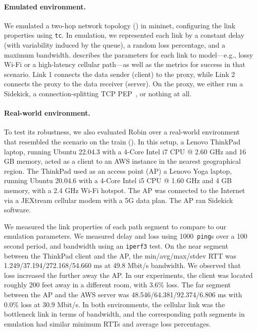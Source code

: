 \paragraph{Emulated environment.}
We emulated a two-hop network topology () in mininet,
configuring the link properties using \texttt{tc}.
In emulation, we represented
each link by a constant delay (with variability induced by the queue), a random
loss percentage, and a maximum bandwidth.
 describes the parameters
for each link to model---e.g., lossy Wi-Fi or a high-latency cellular
path---as well as the metrics for success in that scenario.
Link 1 connects the data sender (client) to the proxy,
while Link 2 connects the proxy to the data receiver (server).
On the proxy, we either run a Sidekick,
a connection-splitting TCP PEP~\cite{caini2006pepsal}, or nothing at all.

\paragraph{Real-world environment.}
To test its robustness, we also evaluated Robin over a real-world
environment that resembled the scenario on the train ().
In this setup, a Lenovo ThinkPad laptop, running Ubuntu 22.04.3 with a 4-Core
Intel i7 CPU @ 2.60 GHz and 16 GB memory, acted as a client to an AWS instance in
the nearest geographical region. The ThinkPad used as an access point (AP)
a Lenovo Yoga laptop, running Ubuntu 20.04.6 with a 4-Core Intel i5 CPU @
1.60 GHz and 4 GB memory, with a 2.4 GHz Wi-Fi hotspot.
The AP was connected to the Internet via a JEXtream cellular modem
with a 5G data plan. The AP ran Sidekick software.

We measured the link properties of each path segment to compare to
our emulation parameters. We measured delay and loss using 1000~\texttt{ping}s
over a 100 second period, and bandwidth using an \texttt{iperf3} test.
On the near segment between the ThinkPad client and the AP,
the min/avg/max/stdev RTT was 1.249/37.194/272.168/54.660 ms
at 49.8 Mbit/s bandwidth. We observed that loss increased
the further away the AP. In our experiments, the client was located roughly
200 feet away in a different room, with 3.6\% loss.
The far segment between the AP and the AWS server was
48.546/64.381/92.374/6.806 ms with 0.0\% loss at 30.9 Mbit/s.
In both environments, the cellular link was the bottleneck link in terms of
bandwidth, and the corresponding path segments in emulation had similar
minimum RTTs and average loss percentages.

